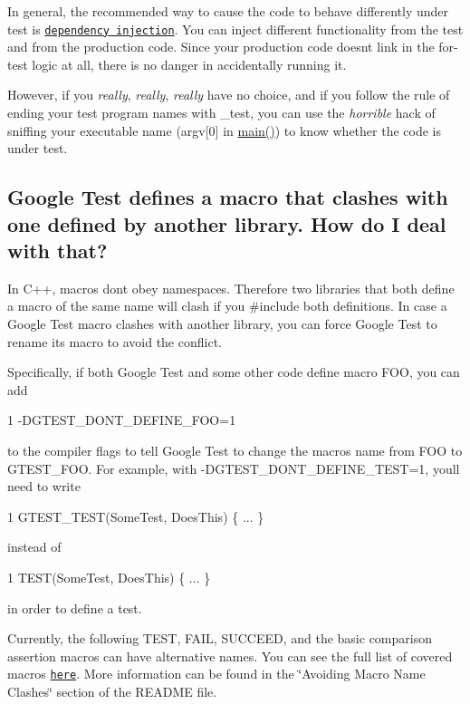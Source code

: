 In general, the recommended way to cause the code to behave differently under test is \href{http://jamesshore.com/Blog/Dependency-Injection-Demystified.html}{\tt dependency injection}. You can inject different functionality from the test and from the production code. Since your production code doesn\textquotesingle{}t link in the for-\/test logic at all, there is no danger in accidentally running it.

However, if you {\itshape really}, {\itshape really}, {\itshape really} have no choice, and if you follow the rule of ending your test program names with {\ttfamily \+\_\+test}, you can use the {\itshape horrible} hack of sniffing your executable name ({\ttfamily argv\mbox{[}0\mbox{]}} in {\ttfamily \hyperlink{app_2main_8cpp_ae66f6b31b5ad750f1fe042a706a4e3d4}{main()}}) to know whether the code is under test.

\subsection*{Google Test defines a macro that clashes with one defined by another library. How do I deal with that?}

In C++, macros don\textquotesingle{}t obey namespaces. Therefore two libraries that both define a macro of the same name will clash if you {\ttfamily \#include} both definitions. In case a Google Test macro clashes with another library, you can force Google Test to rename its macro to avoid the conflict.

Specifically, if both Google Test and some other code define macro {\ttfamily F\+OO}, you can add 
\begin{DoxyCode}
1 -DGTEST\_DONT\_DEFINE\_FOO=1
\end{DoxyCode}
 to the compiler flags to tell Google Test to change the macro\textquotesingle{}s name from {\ttfamily F\+OO} to {\ttfamily G\+T\+E\+S\+T\+\_\+\+F\+OO}. For example, with {\ttfamily -\/\+D\+G\+T\+E\+S\+T\+\_\+\+D\+O\+N\+T\+\_\+\+D\+E\+F\+I\+N\+E\+\_\+\+T\+E\+ST=1}, you\textquotesingle{}ll need to write 
\begin{DoxyCode}
1 GTEST\_TEST(SomeTest, DoesThis) \{ ... \}
\end{DoxyCode}
 instead of 
\begin{DoxyCode}
1 TEST(SomeTest, DoesThis) \{ ... \}
\end{DoxyCode}
 in order to define a test.

Currently, the following {\ttfamily T\+E\+ST}, {\ttfamily F\+A\+IL}, {\ttfamily S\+U\+C\+C\+E\+ED}, and the basic comparison assertion macros can have alternative names. You can see the full list of covered macros \href{http://www.google.com/codesearch?q=if+!GTEST_DONT_DEFINE_\w%2B+package:http://googletest\.googlecode\.com+file:/include/gtest/gtest.h}{\tt here}. More information can be found in the \char`\"{}\+Avoiding Macro Name Clashes\char`\"{} section of the R\+E\+A\+D\+ME file.

